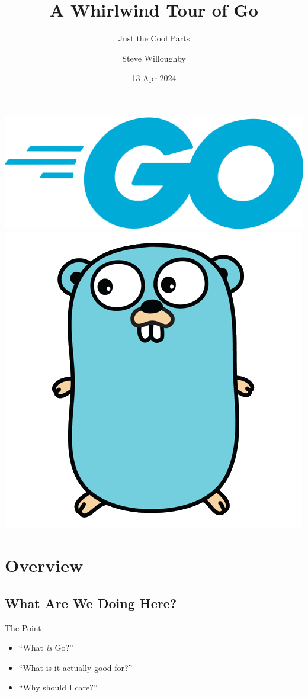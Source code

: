 \documentclass[pdf]{beamer}
\title{A Whirlwind Tour of Go}
\subtitle{Just the Cool Parts}
\author{Steve Willoughby}
\date{13-Apr-2024\\{\tiny\REV}}
\begin{document}
\begin{frame}
    \titlepage
    \begin{center}
    \includegraphics[height=.25\textheight]{go-logo}
    \includegraphics[height=.25\textheight]{gopher}
    \end{center}
\end{frame}
\section[Overview]{Overview}
\subsection{What Are We Doing Here?}
\begin{frame}{The Point}
    \begin{itemize}
        \item ``What \emph{is} Go?''
        \item ``What is it actually good for?''
        \item ``Why should I care?''
    \end{itemize}
\end{frame}
\end{document}
